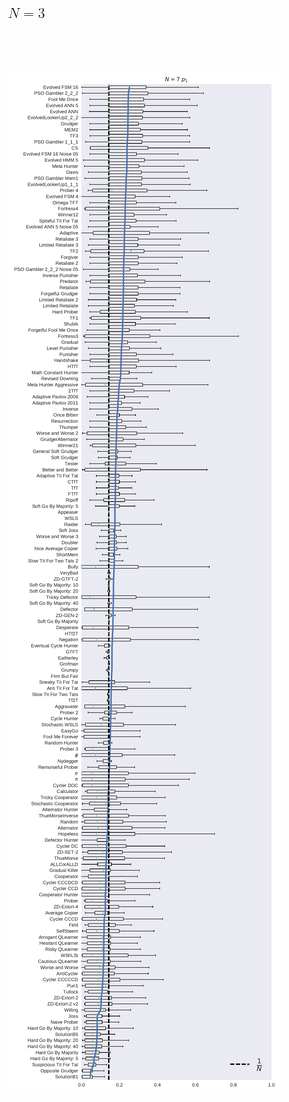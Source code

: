 \documentclass{article}
\begin{document}
\begin{figure}[!hbtp]
\begin{subfigure}{.3\textwidth}
        \caption{\(N=3\)}
        \label{fig:boxplot_3_invade}
    \end{subfigure}%
    ~
    \begin{subfigure}{.3\textwidth}
        \centering
        \includegraphics[height=.9\textheight]{./img/boxplot_7_invade.pdf}

\end{subfigure}
\end{figure}
\end{document}
